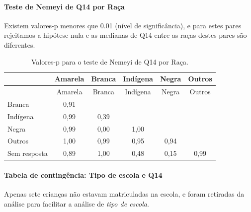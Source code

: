 \documentclass[]{article}
\let\oldparagraph\paragraph
\renewcommand{\paragraph}[1]{\oldparagraph{#1}\mbox{}}
\begin{document}
\hypertarget{teste-de-nemeyi-de-q14-por-rauxe7a}{%
\paragraph{Teste de Nemeyi de Q14 por Raça}\label{teste-de-nemeyi-de-q14-por-rauxe7a}}

Existem valores-p menores que 0.01 (nível de significância), e para estes pares rejeitamos a hipótese nula e as medianas de Q14 entre as raças destes pares são diferentes.

\begin{longtable}[]{@{}lccccc@{}}
\caption{\label{tab:unnamed-chunk-51}Valores-p para o teste de Nemeyi de Q14 por Raça.}\tabularnewline
\toprule
& Amarela & Branca & Indígena & Negra & Outros\tabularnewline
\midrule
\endfirsthead
\toprule
& Amarela & Branca & Indígena & Negra & Outros\tabularnewline
\midrule
\endhead
Branca & 0,91 & & & &\tabularnewline
Indígena & 0,99 & 0,39 & & &\tabularnewline
Negra & 0,99 & 0,00 & 1,00 & &\tabularnewline
Outros & 1,00 & 0,99 & 0,95 & 0,94 &\tabularnewline
Sem resposta & 0,89 & 1,00 & 0,48 & 0,15 & 0,99\tabularnewline
\bottomrule
\end{longtable}

\cleardoublepage

\hypertarget{tabela-de-continguxeancia-tipo-de-escola-e-q14}{%
\paragraph{Tabela de contingência: Tipo de escola e Q14}\label{tabela-de-continguxeancia-tipo-de-escola-e-q14}}

Apenas sete crianças não estavam matriculadas na escola, e foram retiradas da análise para facilitar a análise de \emph{tipo de escola}.
\end{document}
